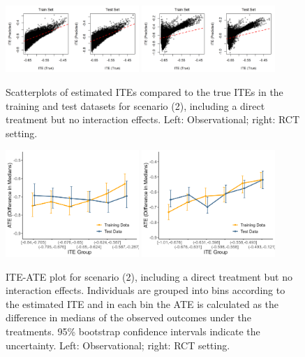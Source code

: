 \begin{figure}[htbp]
\centering
\includegraphics[width=0.45\textwidth]{img/results/observ_scenario2_ITE_scatter_train_test.png}
\includegraphics[width=0.45\textwidth]{img/results/rct_scenario2_ITE_scatter_train_test.png}
\caption{Scatterplots of estimated ITEs compared to the true ITEs in the training and test datasets for scenario (2), including a direct treatment but no interaction effects. Left: Observational; right: RCT setting.}
\label{fig:scenario2_ite_scatter_train_test}
\end{figure}




\begin{figure}[htbp]
\centering
\includegraphics[width=0.45\textwidth]{img/results/observ_scenario2_ITE_cATE.png}
\includegraphics[width=0.45\textwidth]{img/results/rct_scenario2_ITE_cATE.png}
\caption{ITE-ATE plot for scenario (2), including a direct treatment but no interaction effects. Individuals are grouped into bins according to the estimated ITE and in each bin the ATE is calculated as the difference in medians of the observed outcomes under the treatments. 95\% bootstrap confidence intervals indicate the uncertainty. Left: Observational; right: RCT setting.}
\label{fig:scenario2_ite_cATE}
\end{figure}



